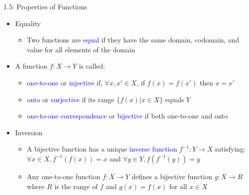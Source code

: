 \documentclass[10pt,english,aspectratio=169]{beamer}
\begin{document}
\begin{frame}{1.5: Properties of Functions}

\begin{itemize}
\setlength\itemsep{3mm}
\item<1-> Equality \vspace{1mm}
\begin{itemize}
  \setlength\itemsep{1.5mm}
  \item Two functions are \textcolor{blue}{equal} if they have the same domain, codomain, and value for all elements of the domain
\end{itemize}

\item<2-> A function $f \colon X \to Y$ is called: \vspace{1mm}
\begin{itemize}
  \setlength\itemsep{1.5mm}
  \item \textcolor{blue}{one-to-one} or \textcolor{blue}{injective} if, $\forall x,x'\in X$, if $f(x)=f(x')$ then $x=x'$
  \item \textcolor{blue}{onto} or \textcolor{blue}{surjective} if its range $\{ f(x) | x\in X\}$ equals $Y$
  \item \textcolor{blue}{one-to-one correspondence} or \textcolor{blue}{bijective} if both one-to-one and onto
\end{itemize}

\item<3-> Inversion \vspace{1mm}
\begin{itemize}
  \setlength\itemsep{1.5mm}
  \item A bijective function has a unique \textcolor{blue}{inverse function} $f^{-1} \colon Y\rightarrow X$ satisfying: $\forall x\in X, f^{-1}(f(x)) = x$ and $\forall y\in Y, f(f^{-1}(y)) = y$
  \item Any one-to-one function $f \colon X\rightarrow Y$ defines a bijective function $g \colon X \rightarrow R$ where $R$ is the range of $f$ and $g(x)=f(x)$ for all $x\in X$

\end{itemize}

\end{itemize}
\end{frame}    
\end{document}
